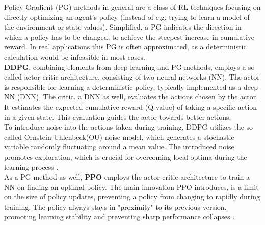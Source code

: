 Policy Gradient (PG) methods in general are a class of RL techniques focusing on directly optimizing an agent's policy (instead of e.g. trying to learn a model of the environment or state values).
Simplified, a PG indicates the direction in which a policy has to be changed, to achieve the steepest increase in cumulative reward.
In real applications this PG is often approximated, as a deterministic calculation would be infeasible in most cases.\\
\textbf{DDPG}, combining elements from deep learning and PG methods, employs a so called actor-critic architecture, consisting of two neural networks (NN).
The actor is responsible for learning a deterministic policy, typically implemented as a deep NN (DNN).
The critic, a DNN as well, evaluates the actions chosen by the actor. It estimates the expected cumulative reward (Q-value) of taking a specific action in a given state.
This evaluation guides the actor towards better actions.\\
To introduce noise into the actions taken during training, DDPG utilizes the so called Ornstein-Uhlenbeck(OU) noise model, which generates a stochastic variable randomly fluctuating around a mean value.
The introduced noise promotes exploration, which is crucial for overcoming local optima during the learning process \parencite{openAI_DDPG}.\\
As a PG method as well, \textbf{PPO} employs the actor-critic architecture to train a NN on finding an optimal policy.
The main innovation PPO introduces, is a limit on the size of policy updates, preventing a policy from changing to rapidly during training.
The policy always stays in "proximity" to its previous version, promoting learning stability and preventing sharp performance collapses \parencite{openAI_PPO}.\\


